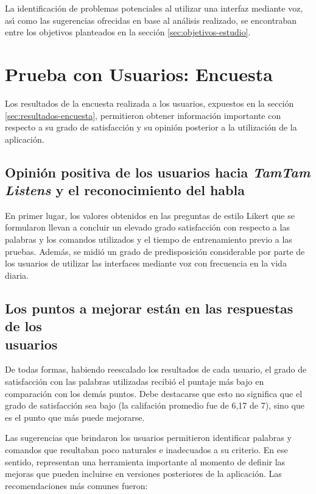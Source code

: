 La identificaci\'on de problemas potenciales al utilizar una interfaz mediante voz, as{\'\i} como las sugerencias
ofrecidas en base al an\'alisis realizado, se encontraban entre los objetivos planteados en la secci\'on 
\ref{sec:objetivos-estudio}.

\section{Prueba con Usuarios: Encuesta}
Los resultados de la encuesta realizada a los usuarios, expuestos en la secci\'on \ref{sec:resultados-encuesta},
permitieron obtener informaci\'on importante con respecto a su grado de satisfacci\'on y su opini\'on 
posterior a la utilizaci\'on de la aplicaci\'on.

\subsection[Opini\'on positiva de los usuarios hacia \emph{TamTam Listens} y el \\ reconocimiento del habla]
{Opini\'on positiva de los usuarios hacia \emph{TamTam Listens} y el reconocimiento del habla}
En primer lugar, los valores obtenidos en las preguntas de estilo Likert que se formularon
llevan a concluir un elevado grado satisfacci\'on con respecto a las palabras y los comandos
utilizados y el tiempo de entrenamiento previo a las pruebas.
Adem\'as, se midi\'o un grado de predisposici\'on considerable por parte de los usuarios de utilizar
las interfaces mediante voz con frecuencia en la vida diaria.

\subsection[Los puntos a mejorar est\'an en las respuestas de los usuarios]
{Los puntos a mejorar est\'an en las respuestas de los \\ usuarios}
De todas formas, habiendo reescalado los resultados de cada usuario, el grado de satisfacci\'on
con las palabras utilizadas recibi\'o el puntaje m\'as bajo en comparaci\'on con los dem\'as puntos.
Debe destacarse que esto no significa que el grado de satisfacci\'on sea bajo (la califaci\'on promedio
fue de 6,17 de 7), sino que es el punto que m\'as puede mejorarse.

Las sugerencias que brindaron los usuarios permitieron identificar palabras y comandos que 
resultaban poco naturales e inadecuados a su criterio. En ese sentido, representan una herramienta
importante al momento de definir las mejoras que pueden incluirse en versiones posteriores de la
aplicaci\'on. Las recomendaciones m\'as comunes fueron:

